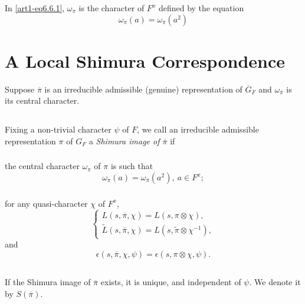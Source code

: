 In \eqref{art1-eq6.6.1}, $\omega_{\pi}$ is the character of $F^{x}$ defined by the equation
\begin{equation}
\omega_{\pi}(a)=\omega_{\overline{\pi}}(a^{2})\label{art1-eq6.6.2}
\end{equation}

\section{A Local Shimura Correspondence}\label{art1-sec7}

Suppose $\overline{\pi}$ is an irreducible admissible (genuine) representation of $\overline{G}_{F}$ and $\omega_{\overline{\pi}}$ is its central character.

\subsection{}\label{art1-sec7.1}\pageoriginale
Fixing a non-trivial character $\psi$ of $F$, we call an irreducible admissible representation $\pi$ of $G_{F}$ a {\em Shimura image of $\overline{\pi}$} if

\subsubsection{}\label{art1-sec7.1.1}
the central character $\omega_{\pi}$ of $\pi$ is such that
$$
\omega_{\pi}(a)=\omega_{\overline{\pi}}(a^{2}), \ a\in F^{x};
$$

\subsubsection{}\label{art1-sec7.1.2}
for any quasi-character $\chi$ of $F^{x}$,
$$
\begin{cases}
L(s,\overline{\pi},\chi)=L(s,\pi\otimes \chi),\\
\widetilde{L}(s,\overline{\pi},\chi)=L(s,\widetilde{\pi}\otimes \chi^{-1}),
\end{cases}
$$
and
$$
\epsilon(s,\overline{\pi},\chi,\psi)=\epsilon(s,\pi\otimes \chi,\psi).
$$

\subsection{}\label{art1-sec7.2}
If the Shimura image of $\overline{\pi}$ exists, it is unique, and independent of $\psi$. We denote it by $S(\overline{\pi})$.

